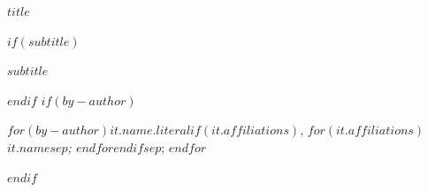 
\begin{center}
    {\LARGE\bfseries $title$\par}
$if(subtitle)$
    \vspace{0.35em}
    {\large\itshape $subtitle$\par}
$endif$
    \vspace{0.55em}
$if(by-author)$
    {\normalsize $for(by-author)$$it.name.literal$$if(it.affiliations)$, \textit{$for(it.affiliations)$$it.name$$sep$; $endfor$}$endif$$sep$; $endfor$\par}
$endif$
\end{center}

\vspace{1.0em}
